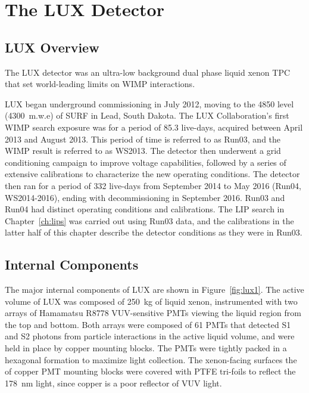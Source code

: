 \chapter{The LUX Detector}

\label{ch:lux} %




\section{LUX Overview}
The \ac{LUX} detector was an ultra-low background dual phase liquid xenon \ac{TPC} that set world-leading limits on \ac{WIMP} interactions.
 
\ac{LUX} began underground commissioning in July 2012, moving to the 4850 level (4300~m.w.e) of \ac{SURF} in Lead, South Dakota.  The \ac{LUX} Collaboration's first \ac{WIMP} search exposure was for a period of 85.3 live-days, acquired between April 2013 and August 2013. This period of time is referred to as Run03, and the \ac{WIMP} result is referred to as WS2013. The detector then underwent a grid conditioning campaign to improve voltage capabilities, followed by a series of extensive calibrations to characterize the new operating conditions. The detector then ran for a period of 332 live-days from September 2014 to May 2016 (Run04, WS2014-2016), ending with decommissioning in September 2016. Run03 and Run04 had distinct operating conditions and calibrations. The \ac{LIP} search in Chapter~\ref{ch:lips} was carried out using Run03 data, and the calibrations in the latter half of this chapter describe the detector conditions as they were in Run03. 

\section{Internal Components}
The major internal components of \ac{LUX} are shown in Figure~\ref{fig:lux1}. The active volume of \ac{LUX} was composed of 250~kg of liquid xenon, instrumented with two arrays of Hamamatsu R8778 \ac{VUV}-sensitive \ac{PMT}s viewing the liquid region from the top and bottom. Both arrays were composed of 61 \ac{PMT}s that detected S1 and S2 photons from particle interactions in the active liquid volume, and were held in place by copper mounting blocks. The \ac{PMT}s were tightly packed in a hexagonal formation to maximize light collection. The xenon-facing surfaces the of copper \ac{PMT} mounting blocks were covered with \ac{PTFE} tri-foils to reflect the 178~nm light, since copper is a poor reflector of \ac{VUV} light. 

